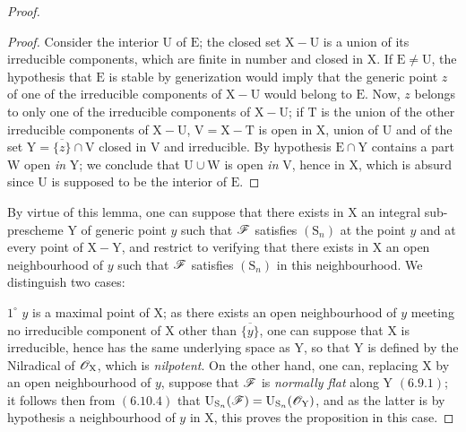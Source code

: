 \begin{proof}
\begin{proof}
Consider the interior $\mathrm{U}$ of $\mathrm{E}$; the closed set $\mathrm{X}-\mathrm{U}$ is a union of its
irreducible components, which are finite in number and closed in $\mathrm{X}$. If $\mathrm{E}\neq\mathrm{U}$,
the hypothesis that $\mathrm{E}$ is stable by generization would imply that the generic point $z$ of one
of the irreducible components of $\mathrm{X}-\mathrm{U}$ would belong to $\mathrm{E}$. Now, $z$ belongs to only
one of the irreducible components of $\mathrm{X}-\mathrm{U}$; if $\mathrm{T}$ is the union of the other
irreducible components of $\mathrm{X}-\mathrm{U}$, $\mathrm{V}=\mathrm{X}-\mathrm{T}$ is open in $\mathrm{X}$, union of $\mathrm{U}$ and of
the set $\mathrm{Y}=\overline{\{z\}}\cap\mathrm{V}$ closed in $\mathrm{V}$ and irreducible. By hypothesis $\mathrm{E}\cap\mathrm{Y}$ contains
a part $\mathrm{W}$ open \emph{in} $\mathrm{Y}$; we conclude that $\mathrm{U}\cup\mathrm{W}$ is open \emph{in} $\mathrm{V}$, hence in $\mathrm{X}$,
which is absurd since $\mathrm{U}$ is supposed to be the interior of $\mathrm{E}$.
\end{proof}


By virtue of this lemma, one can suppose that there exists in $\mathrm{X}$ an integral sub-prescheme
$\mathrm{Y}$ of generic point $y$ such that $\mathscr{F}$ satisfies $(\mathrm{S}_n)$ at the point $y$ and at every point of
$\mathrm{X}-\mathrm{Y}$, and restrict to verifying that there exists in $\mathrm{X}$ an open neighbourhood of $y$ such
that $\mathscr{F}$ satisfies $(\mathrm{S}_n)$ in this neighbourhood. We distinguish two cases:

$1^\circ$ $y$ is a maximal point of $\mathrm{X}$; as there exists an open neighbourhood of $y$ meeting
no irreducible component of $\mathrm{X}$ other than $\overline{\{y\}}$, one can suppose
that $\mathrm{X}$ is irreducible, hence has the same underlying space as $\mathrm{Y}$, so that $\mathrm{Y}$ is defined
by the Nilradical of $\mathscr{O}_\mathrm{X}$, which is \emph{nilpotent}. On the other hand, one can, replacing $\mathrm{X}$ by
an open neighbourhood of $y$, suppose that $\mathscr{F}$ is \emph{normally flat} along $\mathrm{Y}$ $(6.9.1)$;
it follows then from $(6.10.4)$ that $\mathrm{U}_{\mathrm{S}_n}(\mathscr{F})=\mathrm{U}_{\mathrm{S}_n}(\mathscr{O}_\mathrm{Y})$, and as the latter is by hypothesis a
neighbourhood of $y$ in $\mathrm{X}$, this proves the proposition in this case.


\end{proof}
